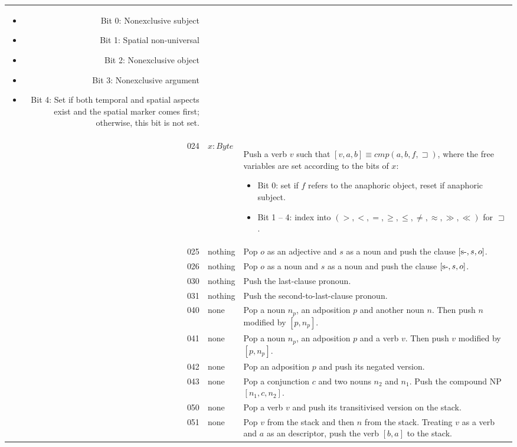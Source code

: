 \documentclass{book}
\begin{document}
\begin{longtabu}[c]{r|l|Y}
\begin{itemize}
        \begin{itemize}
            \item Bit 0: Nonexclusive subject
            \item Bit 1: Spatial non-universal
            \item Bit 2: Nonexclusive object
            \item Bit 3: Nonexclusive argument
            \item Bit 4: Set if both temporal and spatial aspects exist and the spatial marker comes first; otherwise, this bit is not set.
        \end{itemize}
    \end{itemize}
    \\
    024 & $x: Byte$ & Push a verb $v$ such that $[v, a, b] \equiv cmp(a, b, f, \sqsupset)$, where the free variables are set according to the bits of $x$:
    \begin{itemize}
        \item Bit 0: set if $f$ refers to the anaphoric object, reset if anaphoric subject.
        \item Bit 1 -- 4: index into $(>, <, =, \ge, \le, \ne, \approx, \gg, \ll)$ for $\sqsupset$.
    \end{itemize}
    \\
    025 & nothing & Pop $o$ as an adjective and $s$ as a noun and push the clause $[\text{{\normalfont s-}}, s, o]$. \\
    026 & nothing & Pop $o$ as a noun and $s$ as a noun and push the clause $[\text{{\normalfont s-}}, s, o]$. \\
    030 & nothing & Push the last-clause pronoun. \\
    031 & nothing & Push the second-to-last-clause pronoun. \\
    040 & none & Pop a noun $n_p$, an adposition $p$ and another noun $n$. Then push $n$ modified by $[p, n_p]$. \\
    041 & none & Pop a noun $n_p$, an adposition $p$ and a verb $v$. Then push $v$ modified by $[p, n_p]$. \\
    042 & none & Pop an adposition $p$ and push its negated version. \\
    043 & none & Pop a conjunction $c$ and two nouns $n_2$ and $n_1$. Push the compound NP $[n_1, c, n_2]$. \\
    050 & none & Pop a verb $v$ and push its transitivised version on the stack. \\
    051 & none & Pop $v$ from the stack and then $n$ from the stack. Treating $v$ as a verb and $a$ as an descriptor, push the verb $[b, a]$ to the stack. \\

\end{longtabu}
\end{document}
